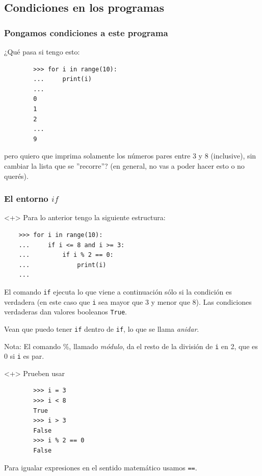 \documentclass{beamer}
\begin{document}
\subsection{Condiciones en los programas}

\begin{frame}[fragile]
    \frametitle{Pongamos condiciones a este programa}
    ¿Qué pasa si tengo esto:
    \begin{verbatim}
        >>> for i in range(10):
        ...     print(i)
        ...
        0
        1
        2
        ...
        9
    \end{verbatim}
    pero quiero que imprima solamente los números pares entre 3 y 8 (inclusive), sin cambiar la lista que se ''recorre''? \footnotesize{(en general, no vas a poder hacer esto o no querés)}.
\end{frame}

\begin{frame}[fragile]
    \frametitle{El entorno $if$}
    \begin{onlyenv}<+>
    Para lo anterior tengo la siguiente estructura:
    \begin{verbatim}
    >>> for i in range(10):
    ...     if i <= 8 and i >= 3:
    ...         if i % 2 == 0:
    ...             print(i)
    ...
    \end{verbatim}
    El comando \texttt{if} ejecuta lo que viene a continuación sólo si la condición es verdadera (en este caso que \texttt{i} sea mayor que 3 y menor que 8). Las condiciones verdaderas dan valores booleanos \texttt{True}. 
    
    Vean que puedo tener \texttt{if} dentro de \texttt{if}, lo que se llama \textit{anidar}. 
    
    \vspace{5mm}
    \tiny{Nota: El comando \%, llamado \textit{módulo}, da el resto de la división de \texttt{i} en 2, que es 0 si \texttt{i} es par.}
    \end{onlyenv}
    
    
    \begin{onlyenv}<+>
        Prueben usar
        \begin{verbatim}
        >>> i = 3
        >>> i < 8
        True
        >>> i > 3
        False
        >>> i % 2 == 0
        False
        \end{verbatim}
        Para igualar expresiones en el sentido matemático usamos \texttt{==}.
    \end{onlyenv}
\end{frame}
\end{document}
